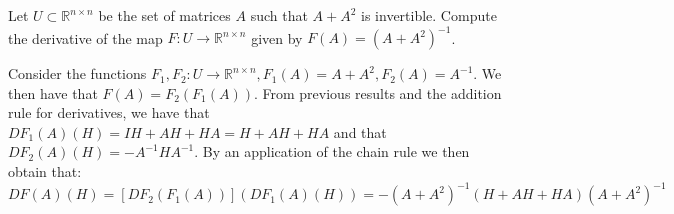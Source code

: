 \begin{exercise}{13}
    Let $U \subset \mathbb{R}^{n \times n}$ be the set of matrices $A$ such that $A + A^2$ is invertible.
    Compute the derivative of the map $F: U \rightarrow \mathbb{R}^{n \times n}$ given by $F(A) = (A + A^2)^{-1}$.
\end{exercise}

\begin{solution}

    Consider the functions $F_1, F_2 : U \rightarrow \mathbb{R}^{n \times n}, F_1(A) = A + A^2, F_2(A) = A^{-1}$.
    We then have that $F(A) = F_2(F_1(A))$.
    From previous results and the addition rule for derivatives, we have that $D F_1(A)(H) = IH + AH + HA = H + AH + HA$ and that $D F_2(A)(H) = -A^{-1}HA^{-1}$.
    By an application of the chain rule we then obtain that:
    $$D F(A)(H) = [D F_2 (F_1(A))] (D F_1(A)(H)) = -(A+A^2)^{-1}(H + AH + HA)(A + A^2)^{-1}$$
\end{solution}